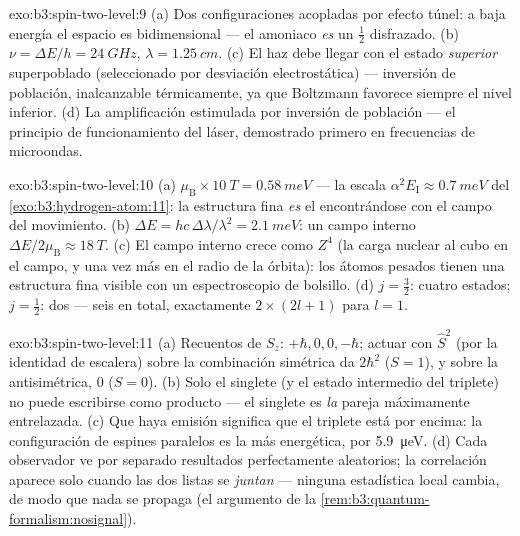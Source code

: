 \begin{solution}{exo:b3:spin-two-level:9}
(a) Dos configuraciones acopladas por efecto túnel: a baja energía el
espacio es bidimensional --- el amoniaco \emph{es} un  $\tfrac12$
disfrazado. (b) $\nu = \Delta E/h = \qty{24}{GHz}$, $\lambda =
\qty{1.25}{cm}$. (c) El haz debe llegar con el estado \emph{superior}
superpoblado (seleccionado por desviación electrostática) ---
inversión de población, inalcanzable térmicamente, ya que Boltzmann
favorece siempre el nivel inferior. (d) La amplificación estimulada por
inversión de población --- el principio de funcionamiento del láser,
demostrado primero en frecuencias de microondas.
\end{solution}

\begin{solution}{exo:b3:spin-two-level:10}
(a) $\mu_{\text{B}} \times \qty{10}{T} = \qty{0.58}{meV}$ --- la
escala $\alpha^2E_{\text{I}} \approx \qty{0.7}{meV}$ del
\cref{exo:b3:hydrogen-atom:11}: la estructura fina \emph{es} el 
encontrándose con el campo del movimiento. (b) $\Delta E = hc\,\Delta\lambda/
\lambda^2 = \qty{2.1}{meV}$: un campo interno $\Delta E/2\mu_{
\text{B}} \approx \qty{18}{T}$. (c) El campo interno crece como
$Z^4$ (la carga nuclear al cubo en el campo, y una vez más en el radio de
la órbita): los átomos pesados tienen una estructura fina visible con un
espectroscopio de bolsillo. (d) $j = \tfrac32$: cuatro estados;
$j = \tfrac12$: dos --- seis en total, exactamente $2 \times (2l + 1)$
para $l = 1$.
\end{solution}

\begin{solution}{exo:b3:spin-two-level:11}
(a) Recuentos de $S_z$: $+\hbar, 0, 0, -\hbar$; actuar con $\hat S^2$
(por la identidad de escalera) sobre la combinación simétrica da
$2\hbar^2$ ($S = 1$), y sobre la antisimétrica, $0$ ($S = 0$). (b)
Solo el singlete (y el estado intermedio del triplete) no puede escribirse
como producto --- el singlete es \emph{la} pareja máximamente
entrelazada. (c) Que haya emisión significa que el triplete está por encima:
la configuración de espines paralelos es la más energética, por
\qty{5.9}{\micro eV}. (d)
Cada observador ve por separado resultados perfectamente aleatorios; la
correlación aparece solo cuando las dos listas se \emph{juntan}
--- ninguna estadística local cambia, de modo que nada se propaga
(el argumento de la \cref{rem:b3:quantum-formalism:nosignal}).
\end{solution}

